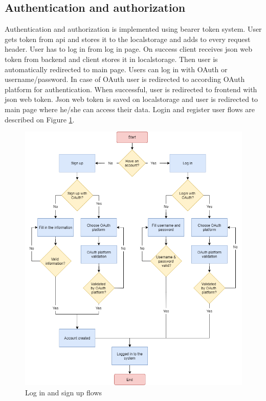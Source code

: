 \subsection{Authentication and authorization}\label{subsec:authentication-and-authorization}
Authentication and authorization is implemented using bearer token system.
User gets token from api and stores it to the localstorage and adds to every request header.
User has to log in from log in page.
On success client receives json web token from backend and client stores it in localstorage.
Then user is automatically redirected to main page.
Users can log in with OAuth or username/password.
In case of OAuth user is redirected to according OAuth platform for authentication.
When successful, user is redirected to frontend with json web token.
Json web token is saved on localstorage and user is redirected to main page where he/she can access their data.
Login and register user flows are described on Figure
\ref{fig:login-signup-diagram}.

\begin{figure}[h]
    \includegraphics[width=\textwidth]{figures/login_signup_diagram}
    \caption{Log in and sign up flows}
    \label{fig:login-signup-diagram}
\end{figure}

